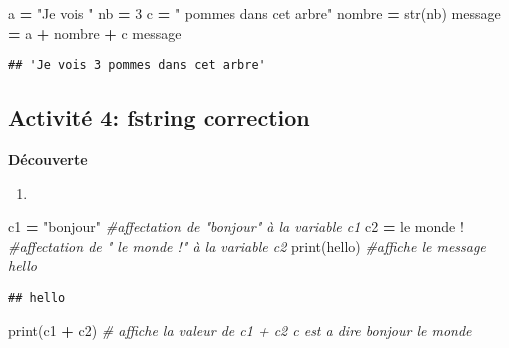 \documentclass[
]{book}
\newenvironment{Shaded}{\begin{snugshade}}{\end{snugshade}}
\newcommand{\BuiltInTok}[1]{#1}
\newcommand{\CommentTok}[1]{\textcolor[rgb]{0.56,0.35,0.01}{\textit{#1}}}
\newcommand{\DecValTok}[1]{\textcolor[rgb]{0.00,0.00,0.81}{#1}}
\newcommand{\NormalTok}[1]{#1}
\newcommand{\OperatorTok}[1]{\textcolor[rgb]{0.81,0.36,0.00}{\textbf{#1}}}
\newcommand{\StringTok}[1]{\textcolor[rgb]{0.31,0.60,0.02}{#1}}
\providecommand{\tightlist}{%
  \setlength{\itemsep}{0pt}\setlength{\parskip}{0pt}}
\def\tightlist{}
\begin{document}
\begin{Shaded}
\begin{Highlighting}[]
\NormalTok{a }\OperatorTok{=} \StringTok{"Je vois "}
\NormalTok{nb }\OperatorTok{=} \DecValTok{3}
\NormalTok{c }\OperatorTok{=} \StringTok{" pommes dans cet arbre"}
\NormalTok{nombre }\OperatorTok{=} \BuiltInTok{str}\NormalTok{(nb)}
\NormalTok{message }\OperatorTok{=}\NormalTok{ a }\OperatorTok{+}\NormalTok{ nombre }\OperatorTok{+}\NormalTok{ c}
\NormalTok{message}
\end{Highlighting}
\end{Shaded}

\begin{verbatim}
## 'Je vois 3 pommes dans cet arbre'
\end{verbatim}

\hypertarget{activituxe9-4-fstring-correction}{%
\subsection{Activité 4: fstring correction}\label{activituxe9-4-fstring-correction}}

\textbf{Découverte}

\begin{enumerate}
\def\labelenumi{\arabic{enumi}.}
\setcounter{enumi}{1}
\tightlist
\item
\end{enumerate}

\begin{Shaded}
\begin{Highlighting}[]
\NormalTok{c1 }\OperatorTok{=} \StringTok{"bonjour"} \CommentTok{\#affectation de "bonjour" à la variable c1}
\NormalTok{c2 }\OperatorTok{=} \StringTok{\textquotesingle{} le monde !\textquotesingle{}} \CommentTok{\#affectation de " le monde !" à la variable c2}
\BuiltInTok{print}\NormalTok{(}\StringTok{\textquotesingle{}hello\textquotesingle{}}\NormalTok{) }\CommentTok{\#affiche le message hello}
\end{Highlighting}
\end{Shaded}

\begin{verbatim}
## hello
\end{verbatim}

\begin{Shaded}
\begin{Highlighting}[]
\BuiltInTok{print}\NormalTok{(c1 }\OperatorTok{+}\NormalTok{ c2) }\CommentTok{\# affiche la valeur de c1 + c2 c est a dire bonjour le monde}
\end{Highlighting}
\end{Shaded}
\end{document}
